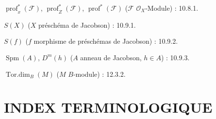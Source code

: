 $\operatorname{prof}^{*}_{x}(\mathcal F)$,
$\operatorname{prof}^{*}_{Z}(\mathcal F)$,
$\operatorname{prof}^{*}(\mathcal F)$
($\mathcal F$ $\mathcal O_X$-Module) : 10.8.1.

$S(X)$ ($X$ préschéma de Jacobson) : 10.9.1.

$S(f)$ ($f$ morphisme de préschémas de Jacobson) : 10.9.2.

$\operatorname{Spm}(A)$, $D^m(h)$ ($A$ anneau de Jacobson, $h\in A$) : 10.9.3.

$\operatorname{Tor.dim}_B(M)$ ($M$ $B$-module) : 12.3.2.

\endgroup

\clearpage
{}
{}
\section*{INDEX TERMINOLOGIQUE}

\begingroup
\footnotesize
\setlength{\parindent}{0pt}
\setlength{\parskip}{1.1pt}
\newcommand{\EGAIVthreeTerm}[2]{#1 : #2.\par}

